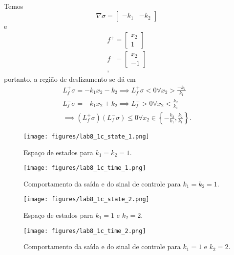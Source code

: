 \documentclass[a4paper]{report}
\begin{document}
Temos \[
    \nabla \sigma = \begin{bmatrix} -k_1 & -k_2 \end{bmatrix} 
\] e 
\begin{align*}
    f^{+} = \begin{bmatrix} x_2 \\ 1 \end{bmatrix} \\
    f^{-} = \begin{bmatrix} x_2 \\ -1 \end{bmatrix} \\
,\end{align*}
portanto, a região de deslizamento se dá em
\begin{align*}
    L_f^{+} \sigma = -k_1x_2 -k_2 \implies L_f^{+}\sigma <0 \forall x_2> \frac{-k_2}{k_1}\\
    L_f^{-} \sigma = -k_1x_2 +k_2 \implies L_f^{-} > 0 \forall  x_2 < \frac{k_2}{k_1} \\
    \implies \left( L_f^{+} \sigma \right) \left( L_f^{-} \sigma \right) \le 0 \forall x_2 \in \left\{ -\frac{k_2}{k_1}, \frac{k_2}{k_1} \right\} 
.\end{align*}


\begin{figure}[H]
    \centering
    \texttt{[image: figures/lab8\_1c\_state\_1.png]}
    \caption{Espaço de estados para $k_1 = k_2 = 1$.}
    \label{fig:figures-lab8_1c_state-png}
\end{figure}

\begin{figure}[H]
    \centering
    \texttt{[image: figures/lab8\_1c\_time\_1.png]}
    \caption{Comportamento da saída e do sinal de controle para $k_1 = k_2 = 1$.}
    \label{fig:figures-lab8_1c_state-png}
\end{figure}

\begin{figure}[H]
    \centering
    \texttt{[image: figures/lab8\_1c\_state\_2.png]}
    \caption{Espaço de estados para $k_1 = 1$ e $k_2 = 2$.}
    \label{fig:figures-lab8_1c_state-png}
\end{figure}

\begin{figure}[H]
    \centering
    \texttt{[image: figures/lab8\_1c\_time\_2.png]}
    \caption{Comportamento da saída e do sinal de controle para $k_1 = 1$ e $k_2 = 2$.}
    \label{fig:figures-lab8_1c_state-png}
\end{figure}
\end{document}
